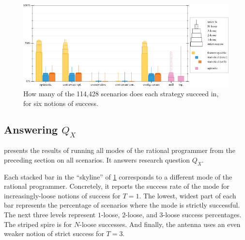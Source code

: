 \begin{figure}[ht]
  \includegraphics[width=\columnwidth]{data/strategy-overall-feasible.pdf}
  \caption{How many of the 114,428 scenarios does each strategy succeed in, for six notions of success.}
  \label{f:strategy-overall}
\end{figure}

\subsection{Answering $Q_X$} \label{subsec:qx}

 presents the results of running all modes of the
rational programmer from the preceding section on all scenarios. It answers
research question $Q_X$. 

Each stacked bar in the ``skyline'' of \cref{f:strategy-overall} corresponds to
a different mode of the rational programmer. Concretely, it reports the success
rate of the mode for increasingly-loose notions of success for $T = 1$.  The
lowest, widest part of each bar represents the percentage of scenarios where the
mode is strictly successful. The next three levels represent $1$-loose,
$2$-loose, and $3$-loose success percentages.  The striped spire is for
$N$-loose successes.  And finally, the antenna uses an even weaker notion of
strict success for $T = 3$.

